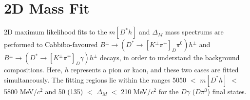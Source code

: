 \documentclass[oneside,12pt]{article}
\begin{document}
{\begin{landscape}
\begin{table}[]
\centering
{}
\caption{\small{Variables used in the training of the second stage BDT, ranked
by importance. $\gamma^{1}$ and $\gamma^{2}$ refer to the two daughter photons of the
$\pi^0$.}}
\label{table:bdt2TrainingVar}
\end{table}
\end{landscape}
}

\section{2D Mass Fit} \label{sec:massfit}

2D maximum likelihood fits to the $m[D^*h]$ and $\Delta_M$ mass spectrums are
performed to Cabbibo-favoured $B^{\pm}\rightarrow (D^*\rightarrow
[K^{\pm}\pi^{\mp}]_D\pi^0)h^{\pm}$ and $B^{\pm}\rightarrow (D^*\rightarrow
[K^{\pm}\pi^{\mp}]_D\gamma)h^{\pm}$ decays, in order to understand the
background compositions. Here, $h$ represents a pion or kaon, and these two
cases are fitted simultaneously. The fitting regions lie within the ranges 5050
$<$ $m[D^*h]$ $<$ 5800 MeV/$c^2$ and 50 (135) $<$ $\Delta_M$ $<$ 210 MeV/$c^2$
for the $D\gamma$ ($D\pi^0$) final states.
\end{document}
